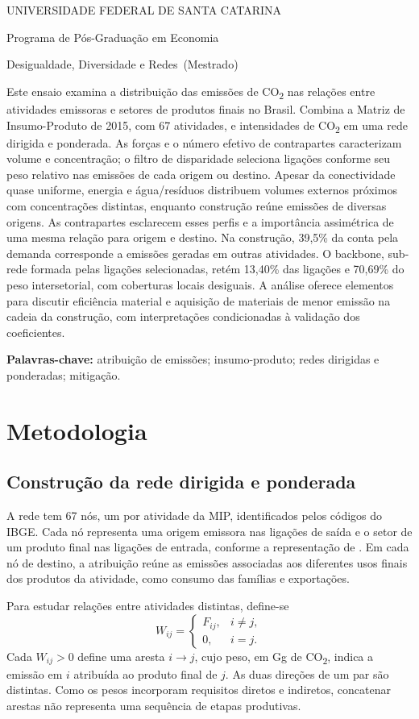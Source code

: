 \documentclass[11pt]{article}
\renewenvironment{abstract}{\par\medskip\noindent\textbf{\abstractname}\par\smallskip\small\setstretch{1}\noindent}{\par\medskip}
\newcommand{\instituicao}{UNIVERSIDADE FEDERAL DE SANTA CATARINA}
\newcommand{\departamento}{Programa de Pós-Graduação em Economia}
\newcommand{\curso}{Mestrado}
\newcommand{\disciplina}{Desigualdade, Diversidade e Redes}
\newcommand{\titulo}{Rede de emissões de CO\textsubscript{2} no Brasil}
\newcommand{\autor}{Gabriel Pincelli Cintra}
\newcommand{\local}{Florianópolis}
\newcommand{\dataentrega}{18 de outubro de 2026}
\newcommand{\imprimirtitulodois}{
\begin{center}
  {\small\MakeUppercase{\instituicao}\par}
  {\small \departamento\par}
  {\small \disciplina\ (\curso)\par}
  \vspace{1em}{\LARGE\bfseries \titulo\par}
  \vspace{0.7em}{\normalsize \autor\par}
  \vspace{0.3em}{\small \local, \dataentrega\par}
\end{center}
\vspace{0.4em}}
\begin{document}
\imprimirtitulodois
\thispagestyle{empty}
\begin{abstract}
Este ensaio examina a distribuição das emissões de CO\textsubscript{2} nas relações entre atividades emissoras e setores de produtos finais no Brasil. Combina a Matriz de Insumo-Produto de 2015, com 67 atividades, e intensidades de CO\textsubscript{2} em uma rede dirigida e ponderada. As forças e o número efetivo de contrapartes caracterizam volume e concentração; o filtro de disparidade seleciona ligações conforme seu peso relativo nas emissões de cada origem ou destino. Apesar da conectividade quase uniforme, energia e água/resíduos distribuem volumes externos próximos com concentrações distintas, enquanto construção reúne emissões de diversas origens. As contrapartes esclarecem esses perfis e a importância assimétrica de uma mesma relação para origem e destino. Na construção, 39,5\% da conta pela demanda corresponde a emissões geradas em outras atividades. O backbone, sub-rede formada pelas ligações selecionadas, retém 13,40\% das ligações e 70,69\% do peso intersetorial, com coberturas locais desiguais. A análise oferece elementos para discutir eficiência material e aquisição de materiais de menor emissão na cadeia da construção, com interpretações condicionadas à validação dos coeficientes.
\end{abstract}
\noindent\textbf{Palavras-chave:} atribuição de emissões; insumo-produto; redes dirigidas e ponderadas; mitigação.

\clearpage

\clearpage

\clearpage
\section{Metodologia}

\subsection{Construção da rede dirigida e ponderada}
\label{sec:construcao-rede}

A rede tem 67 nós, um por atividade da MIP, identificados pelos códigos do IBGE. Cada nó representa uma origem emissora nas ligações de saída e o setor de um produto final nas ligações de entrada, conforme a representação de \textcite{huang2019}. Em cada nó de destino, a atribuição reúne as emissões associadas aos diferentes usos finais dos produtos da atividade, como consumo das famílias e exportações.

Para estudar relações entre atividades distintas, define-se
\begin{equation}
W_{ij}=\begin{cases}
F_{ij}, & i\ne j,\\
0, & i=j.
\end{cases}
\label{eq:rede-sem-diagonal}
\end{equation}
Cada $W_{ij}>0$ define uma aresta $i\rightarrow j$, cujo peso, em Gg de CO\textsubscript{2}, indica a emissão em $i$ atribuída ao produto final de $j$. As duas direções de um par são distintas. Como os pesos incorporam requisitos diretos e indiretos, concatenar arestas não representa uma sequência de etapas produtivas.
\end{document}
